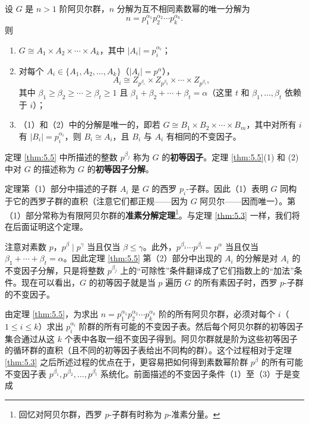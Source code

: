 \begin{theorem}\label{thm:5.5}
设 \(G\) 是 \(n > 1\) 阶阿贝尔群，\(n\) 分解为互不相同素数幂的唯一分解为
\[
n = p_1^{\alpha_1} p_2^{\alpha_2} \cdots p_k^{\alpha_k}.
\]
则

\begin{enumerate}[label=(\arabic*)]
\item \(G \cong A_1 \times A_2 \times \cdots \times A_k\)，其中 \(|A_i| = p_i^{\alpha_i}\)；

\item 对每个 \(A_i \in \{A_1, A_2, \ldots, A_k\}\)（\(|A_i| = p^\alpha\)），
\[
A_i \cong Z_{p^{\beta_1}} \times Z_{p^{\beta_2}} \times \cdots \times Z_{p^{\beta_t}},
\]
其中 \(\beta_1 \geq \beta_2 \geq \cdots \geq \beta_t \geq 1\) 且 \(\beta_1 + \beta_2 + \cdots + \beta_t = \alpha\)（这里 \(t\) 和 \(\beta_1, \ldots, \beta_t\) 依赖于 \(i\)）；

\item （1）和（2）中的分解是唯一的，即若 \(G \cong B_1 \times B_2 \times \cdots \times B_m\)，其中对所有 \(i\) 有 \(|B_i| = p_i^{\alpha_i}\)，则 \(B_i \cong A_i\)，且 \(B_i\) 与 \(A_i\) 有相同的不变因子。
\end{enumerate}
\end{theorem}

\begin{definition}
定理 \ref{thm:5.5} 中所描述的整数 \(p^{\beta_j}\) 称为 \(G\) 的\textbf{初等因子}。定理 \ref{thm:5.5}(1) 和 (2) 中对 \(G\) 的描述称为 \(G\) 的\textbf{初等因子分解}。
\end{definition}

定理第（1）部分中描述的子群 \(A_i\) 是 \(G\) 的西罗 \(p_i\)-子群。因此（1）表明 \(G\) 同构于它的西罗子群的直积（注意它们都正规——因为 \(G\) 阿贝尔——因而唯一）。第（1）部分常称为有限阿贝尔群的\textbf{准素分解定理}\footnote{回忆对阿贝尔群，西罗 \(p\)-子群有时称为 \(p\)-准素分量。}。与定理 \ref{thm:5.3} 一样，我们将在后面证明这个定理。

注意对素数 \(p\)，\(p^\beta \mid p^\gamma\) 当且仅当 \(\beta \leq \gamma\)。此外，\(p^{\beta_1} \cdots p^{\beta_t} = p^\alpha\) 当且仅当 \(\beta_1 + \cdots + \beta_t = \alpha\)。因此定理 \ref{thm:5.5} 第（2）部分中出现的 \(A_i\) 的分解是对 \(A_i\) 的不变因子分解，只是将整数 \(p^{\beta_j}\) 上的“可除性”条件翻译成了它们指数上的“加法”条件。现在可以看出，\(G\) 的初等因子就是当 \(p\) 遍历 \(G\) 的所有素因子时，西罗 \(p\)-子群的不变因子。

由定理 \ref{thm:5.5}，为求出 \(n = p_1^{\alpha_1} p_2^{\alpha_2} \cdots p_k^{\alpha_k}\) 阶的所有阿贝尔群，必须对每个 \(i\)（\(1 \leq i \leq k\)）求出 \(p_i^{\alpha_i}\) 阶群的所有可能的不变因子表。然后每个阿贝尔群的初等因子集合通过从这 \(k\) 个表中各取一组不变因子得到。阿贝尔群就是阶为这些初等因子的循环群的直积（且不同的初等因子表给出不同构的群）。这个过程相对于定理 \ref{thm:5.3} 之后所述过程的优点在于，更容易把如何得到素数幂阶群 \(p^\beta\) 的所有可能不变因子表 \(p^{\beta_1}, p^{\beta_2}, \ldots, p^{\beta_t}\) 系统化。前面描述的不变因子条件（1）至（3）于是变成

